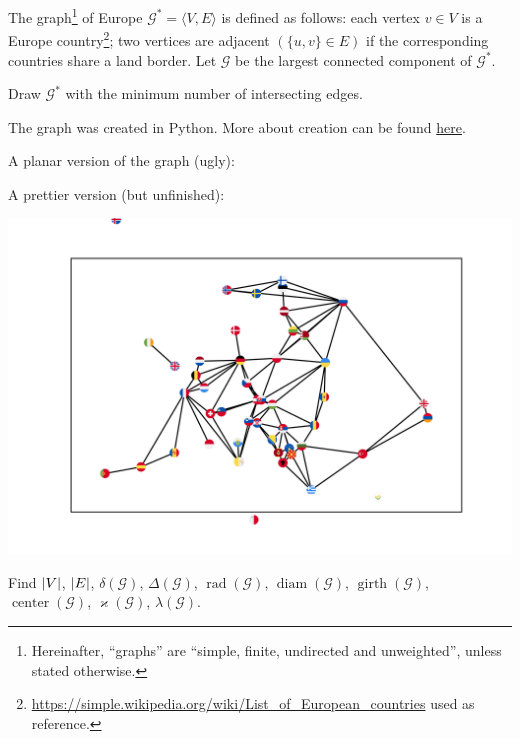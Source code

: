 \documentclass[a4paper,12pt]{article}
\newcommand{\graph}[1][G]{\mathcal{#1}}
\newcommand{\op}[1]{\operatorname*{#1}}
\newcommand{\minDegree}[1]{\delta(#1)}
\newcommand{\maxDegree}[1]{\Delta(#1)}
\newcommand{\graphRadius}[1]{\op{rad}(#1)}
\newcommand{\graphDiameter}[1]{\op{diam}(#1)}
\newcommand{\graphGirth}[1]{\op{girth}(#1)}
\newcommand{\graphCenter}[1]{\op{center}(#1)}
\newcommand{\vertexConnectivity}[1]{\varkappa(#1)}
\newcommand{\edgeConnectivity}[1]{\lambda(#1)}
\begin{document}
\begin{tasks}
    \item The graph\footnote{Hereinafter, \enquote{graphs} are \enquote{simple, finite, undirected and unweighted}, unless stated otherwise.} of Europe $\graph^{*} = \langle V, E\rangle$ is defined as follows: each vertex $v \in V$ is a Europe country\footnote{\url{https://simple.wikipedia.org/wiki/List_of_European_countries} used as reference.}; two vertices are adjacent $(\{u, v\} \in E)$ if the corresponding countries share a land border. Let $\graph$ be the largest connected component of $\graph^{*}$.
    
    \begin{subtasks}
        \item Draw $\graph^{*}$ with the minimum number of intersecting edges.
            
        The graph was created in Python. More about creation can be found \href{https://github.com/sltKaguya/itmo/blob/wip/discr_math/05_graph_theory/05_homework.ipynb}{here}.

        A planar version of the graph (ugly):
        
            \begingroup
            
            \endgroup
        \newpage
        A prettier version (but unfinished):

            \includegraphics{Eurograph}
        \item Find $\left|V\right|$, $\left|E\right|$, $\minDegree{\graph}$, $\maxDegree{\graph}$, $\graphRadius{\graph}$, $\graphDiameter{\graph}$, $\graphGirth{\graph}$, $\graphCenter{\graph}$, $\vertexConnectivity{\graph}$, $\edgeConnectivity{\graph}$.


\end{subtasks}
\end{tasks}
\end{document}
